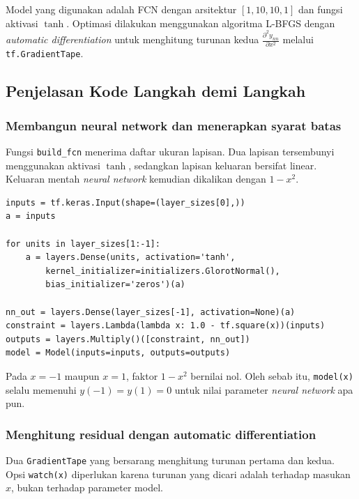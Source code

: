\documentclass[12pt, letterpaper]{article}
\begin{document}
Model yang digunakan adalah FCN dengan arsitektur $[1, 10, 10, 1]$ dan
fungsi aktivasi $\tanh$. Optimasi dilakukan menggunakan algoritma L-BFGS
dengan \textit{automatic differentiation} untuk menghitung turunan kedua
$\frac{\partial^2 y_{nn}}{\partial x^2}$ melalui \texttt{tf.GradientTape}.

\subsection{Penjelasan Kode Langkah demi Langkah}

\subsubsection{Membangun neural network dan menerapkan syarat batas}

Fungsi \texttt{build\_fcn} menerima daftar ukuran lapisan. Dua lapisan
tersembunyi menggunakan aktivasi $\tanh$, sedangkan lapisan keluaran bersifat
linear. Keluaran mentah \textit{neural network} kemudian dikalikan dengan $1-x^2$.

\begin{lstlisting}[caption={FCN dan hard constraint pada masalah Poisson}]
inputs = tf.keras.Input(shape=(layer_sizes[0],))
a = inputs

for units in layer_sizes[1:-1]:
    a = layers.Dense(units, activation='tanh',
        kernel_initializer=initializers.GlorotNormal(),
        bias_initializer='zeros')(a)

nn_out = layers.Dense(layer_sizes[-1], activation=None)(a)
constraint = layers.Lambda(lambda x: 1.0 - tf.square(x))(inputs)
outputs = layers.Multiply()([constraint, nn_out])
model = Model(inputs=inputs, outputs=outputs)
\end{lstlisting}

Pada $x=-1$ maupun $x=1$, faktor $1-x^2$ bernilai nol. Oleh sebab itu,
\texttt{model(x)} selalu memenuhi $y(-1)=y(1)=0$ untuk nilai parameter \textit{neural network}
apa pun.


\subsubsection{Menghitung residual dengan automatic differentiation}

Dua \texttt{GradientTape} yang bersarang menghitung turunan pertama dan kedua.
Opsi \texttt{watch(x)} diperlukan karena turunan yang dicari adalah terhadap
masukan $x$, bukan terhadap parameter model.
\end{document}
